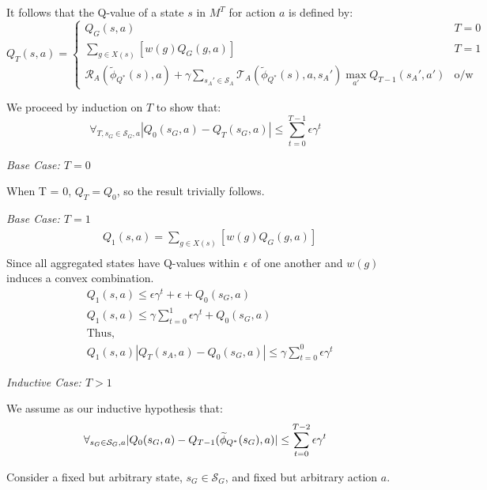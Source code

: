 \documentclass{article}
\newcommand{\ep}{\widetilde \phi}
\newcommand{\epQ}{\ep_{Q^*}}
\begin{document}
It follows that the Q-value of a state $s$ in $M^T$ for action $a$ is defined by:
\begin{equation}
Q_T(s, a) = 
\begin{cases}
	   Q_G(s, a) &  T=0\\
	   \underset{g \in X(s)}{\sum} \left[ w(g)Q_G(g,a) \right] & T = 1\\
	   \mathcal{R}_A(\epQ(s),a) + \gamma \underset{{s_A}' \in \mathcal{S}_A}{\sum} \mathcal{T}_A(\epQ(s),a,{s_A}') \max_{a'} Q_{T-1}({s_A}', a') & \text{o/w}
\end{cases}
\end{equation}


We proceed by induction on $T$ to show that:
\begin{equation}
\forall_{T, s_G \in \mathcal{S}_G, a} |Q_0(s_G, a) - Q_T(s_G, a)| \leq \sum_{t=0}^{T-1} \epsilon \gamma^{t}
\end{equation}

\textit{Base Case: $T = 0$}

When T = 0, $Q_T = Q_0$, so the result trivially follows.

\textit{Base Case: $T = 1$}
\begin{align*}
&Q_1(s,a) = \underset{g \in X(s)}{\sum} \left[ w(g)Q_G(g,a) \right]\\
\end{align*}
Since all aggregated states have Q-values within $\epsilon$ of one another and $w(g)$ induces a convex combination.
\begin{align*}
&Q_1(s,a) \leq \epsilon \gamma^t + \epsilon + Q_0(s_G, a)\\
&Q_1(s,a) \leq \gamma\sum_{t=0}^{1} \epsilon \gamma^t + Q_0(s_G, a)\\
&\text{Thus,}\\
&Q_1(s,a) \left| Q_{T}(s_A, a) - Q_0(s_G,a) \right| \leq \gamma\sum_{t=0}^{0}\epsilon \gamma^t
\end{align*}



\textit{Inductive Case: $T > 1$}

We assume as our inductive hypothesis that:
\begin{equation}
\forall_{s_G \in \mathcal{S}_G, a} |Q_0(s_G, a) - Q_{T-1}(\epQ(s_G), a)| \leq \sum_{t=0}^{T-2} \epsilon \gamma^t\\
\end{equation}

Consider a fixed but arbitrary state, $s_G \in \mathcal{S}_G$, and fixed but arbitrary action $a$.
\end{document}

